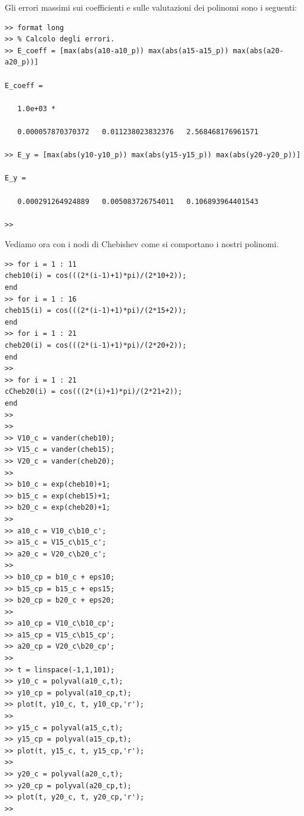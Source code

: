 \begin{enumerate}
\begin{svol}
Gli errori massimi sui coefficienti e sulle valutazioni dei polinomi
 sono i seguenti:
\begin{codice}
\begin{verbatim}
>> format long
>> % Calcolo degli errori.
>> E_coeff = [max(abs(a10-a10_p)) max(abs(a15-a15_p)) max(abs(a20-a20_p))]

E_coeff =

   1.0e+03 *

   0.000057870370372   0.011238023832376   2.568468176961571

>> E_y = [max(abs(y10-y10_p)) max(abs(y15-y15_p)) max(abs(y20-y20_p))]

E_y =

   0.000291264924889   0.005083726754011   0.106893964401543

>> 
\end{verbatim}
\end{codice}

Vediamo ora con i nodi di Chebishev come si comportano i nostri polinomi.
\begin{codice}
\begin{verbatim}
>> for i = 1 : 11
cheb10(i) = cos(((2*(i-1)+1)*pi)/(2*10+2));
end
>> for i = 1 : 16
cheb15(i) = cos(((2*(i-1)+1)*pi)/(2*15+2));
end
>> for i = 1 : 21
cheb20(i) = cos(((2*(i-1)+1)*pi)/(2*20+2));
end
>> 
>> for i = 1 : 21
cCheb20(i) = cos(((2*(i)+1)*pi)/(2*21+2));
end
>> 
>> 
>> V10_c = vander(cheb10);
>> V15_c = vander(cheb15);
>> V20_c = vander(cheb20);
>> 
>> b10_c = exp(cheb10)+1;
>> b15_c = exp(cheb15)+1;
>> b20_c = exp(cheb20)+1;
>> 
>> a10_c = V10_c\b10_c';
>> a15_c = V15_c\b15_c';
>> a20_c = V20_c\b20_c';
>> 
>> b10_cp = b10_c + eps10;
>> b15_cp = b15_c + eps15;
>> b20_cp = b20_c + eps20;
>> 
>> a10_cp = V10_c\b10_cp';
>> a15_cp = V15_c\b15_cp';
>> a20_cp = V20_c\b20_cp';
>> 
>> t = linspace(-1,1,101);
>> y10_c = polyval(a10_c,t);
>> y10_cp = polyval(a10_cp,t);
>> plot(t, y10_c, t, y10_cp,'r');
>> 
>> y15_c = polyval(a15_c,t);
>> y15_cp = polyval(a15_cp,t);
>> plot(t, y15_c, t, y15_cp,'r');
>> 
>> y20_c = polyval(a20_c,t);
>> y20_cp = polyval(a20_cp,t);
>> plot(t, y20_c, t, y20_cp,'r');
>> 
\end{verbatim}
\end{codice}



\end{svol}
\end{enumerate}
